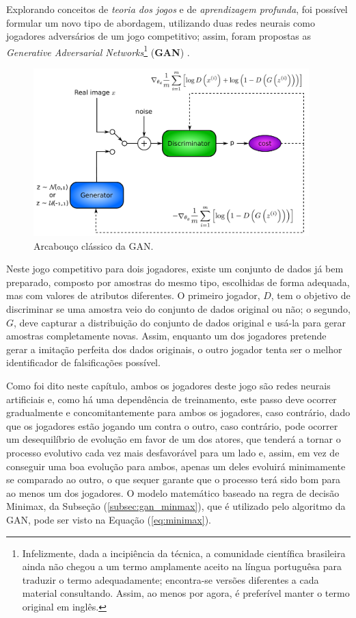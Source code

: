 Explorando conceitos de \textit{teoria dos jogos} e de \textit{aprendizagem profunda}, foi possível formular um novo tipo de abordagem, utilizando duas redes neurais como jogadores adversários de um jogo competitivo; assim, foram propostas as \textit{Generative Adversarial Networks}\footnote{Infelizmente, dada a incipiência da técnica, a comunidade científica brasileira ainda não chegou a um termo amplamente aceito na língua portuguêsa para traduzir o termo adequadamente; encontra-se versões diferentes a cada material consultando. Assim, ao menos por agora, é preferível manter o termo original em inglês.} (\textbf{GAN}) \citep{NIPS2014_5423}. 

\begin{figure}[H]
    \centering
    \includegraphics[width=0.95\textwidth]{figs/gan_framework.pdf}
    \caption{Arcabouço clássico da GAN.}
    \label{fig:gan_framework}
\end{figure}

Neste jogo competitivo para dois jogadores, existe um conjunto de dados já bem preparado, composto por amostras do mesmo tipo, escolhidas de forma adequada, mas com valores de atributos diferentes. O primeiro jogador, $D$, tem o objetivo de discriminar se uma amostra veio do conjunto de dados original ou não; o segundo, $G$, deve capturar a distribuição do conjunto de dados original e usá-la para gerar amostras completamente novas. Assim, enquanto um dos jogadores pretende gerar a imitação perfeita dos dados originais, o outro jogador tenta ser o melhor identificador de falsificações possível.

Como foi dito neste capítulo, ambos os jogadores deste jogo são redes neurais artificiais e, como há uma dependência de treinamento, este passo deve ocorrer gradualmente e concomitantemente para ambos os jogadores, caso contrário, dado que os jogadores estão jogando um contra o outro, caso contrário, pode ocorrer um desequilíbrio de evolução em favor de um dos atores, que tenderá a tornar o processo evolutivo cada vez mais desfavorável para um lado e, assim, em vez de conseguir uma boa evolução para ambos, apenas um deles evoluirá minimamente se comparado ao outro, o que sequer garante que o processo terá sido bom para ao menos um dos jogadores. O modelo matemático baseado na regra de decisão Minimax, da Subseção (\ref{subsec:gan_minmax}), que é utilizado pelo algoritmo da GAN, pode ser visto na Equação (\ref{eq:minimax}).


